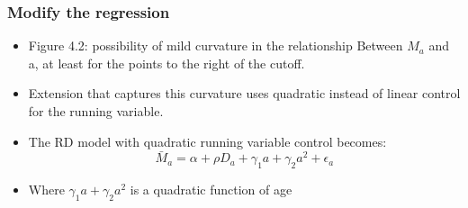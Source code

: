 \documentclass{beamer}
\begin{document}
\begin{frame}
\frametitle{Modify the regression}
\begin{itemize}
	\item Figure 4.2: possibility of mild curvature in the relationship Between ${M}_a$ and a, at least for the points to the right of the cutoff. 
	\item Extension that captures this curvature uses quadratic instead of linear control for the running variable. 
	\item The RD model with quadratic running variable control becomes:
	$$\bar{M}_a=\alpha + \rho D_a + \gamma_1 a +\gamma_2 a^2 + \epsilon_a $$
	\item Where $\gamma_1 a + \gamma_2 a^2$ is a quadratic function of age

\end{itemize}

\end{frame}
\end{document}
